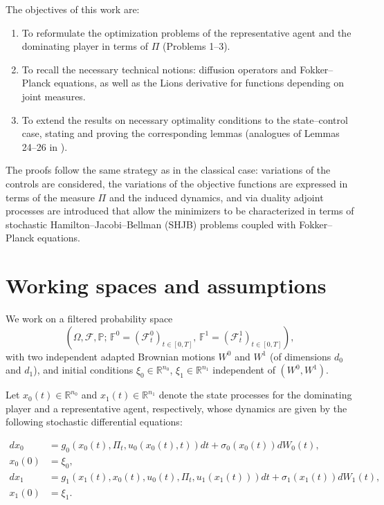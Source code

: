 \documentclass[12pt]{article}
\theoremstyle{definition}
\begin{document}
The objectives of this work are:
\begin{enumerate}
    \item To reformulate the optimization problems of the representative agent and the dominating player in terms of $\Pi$ (Problems 1--3).
    \item To recall the necessary technical notions: diffusion operators and Fokker--Planck equations, as well as the Lions derivative for functions depending on joint measures.
    \item To extend the results on necessary optimality conditions to the state--control case, stating and proving the corresponding lemmas (analogues of Lemmas 24--26 in \cite{bensoussan2014mfgdominating}).
\end{enumerate}

The proofs follow the same strategy as in the classical case: variations of the controls are considered, the variations of the objective functions are expressed in terms of the measure $\Pi$ and the induced dynamics, and via duality adjoint processes are introduced that allow the minimizers to be characterized in terms of stochastic Hamilton--Jacobi--Bellman (SHJB) problems coupled with Fokker--Planck equations.

\clearpage

\section{Working spaces and assumptions}

We work on a filtered probability space
\[
(\Omega,\mathcal{F},\mathbb{P};\,\mathbb{F}^0=(\mathcal{F}^0_t)_{t\in[0,T]},\,\mathbb{F}^1=(\mathcal{F}^1_t)_{t\in[0,T]}),
\]
with two independent adapted Brownian motions $W^0$ and $W^1$ (of dimensions $d_0$ and $d_1$), and initial conditions $\xi_0\in \mathbb{R}^{n_0}$, $\xi_1\in \mathbb{R}^{n_1}$ independent of $(W^0,W^1)$.

Let \( x_0(t) \in \mathbb{R}^{n_0} \) and \( x_1(t) \in \mathbb{R}^{n_1} \) denote the state processes for the dominating player and a representative agent, respectively, whose dynamics are given by the following stochastic differential equations:

\[
\begin{aligned}
    dx_0 &= g_0 \left( x_0(t), \Pi_t, u_0(x_0(t), t) \right) dt + \sigma_0 \left( x_0(t) \right) dW_0(t), \\
    x_0(0) &= \xi_0, \\
    dx_1 &= g_1 \left( x_1(t), x_0(t), u_0(t), \Pi_t, u_1(x_1(t)) \right) dt + \sigma_1 \left( x_1(t) \right) dW_1(t), \\
    x_1(0) &= \xi_1.
\end{aligned}
\]
\end{document}
